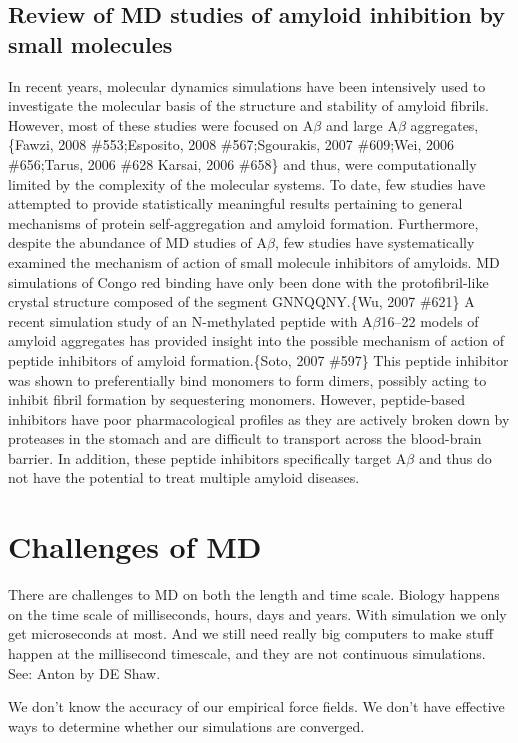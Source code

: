 \subsection{Review of MD studies of amyloid inhibition by small molecules}
\1 In recent years, molecular dynamics simulations have been intensively used to investigate the molecular basis of the structure and stability of amyloid fibrils. However, most of these studies were focused on A$\beta$ and large A$\beta$ aggregates,\{Fawzi, 2008 \#553;Esposito, 2008 \#567;Sgourakis, 2007 \#609;Wei, 2006 \#656;Tarus, 2006 \#628 Karsai, 2006 \#658\} and thus, were computationally limited by the complexity of the molecular systems. To date, few studies have attempted to provide statistically meaningful results pertaining to general mechanisms of protein self-aggregation and amyloid formation. Furthermore, despite the abundance of MD studies of A$\beta$, few studies have systematically examined the mechanism of action of small molecule inhibitors of amyloids. MD simulations of Congo red binding have only been done with the protofibril-like crystal structure composed of the segment GNNQQNY.\{Wu, 2007 \#621\} A recent simulation study of an N-methylated peptide with A$\beta$16--22 models of amyloid aggregates has provided insight into the possible mechanism of action of peptide inhibitors of amyloid formation.\{Soto, 2007 \#597\} This peptide inhibitor was shown to preferentially bind monomers to form dimers, possibly acting to inhibit fibril formation by sequestering monomers. However, peptide-based inhibitors have poor pharmacological profiles as they are actively broken down by proteases in the stomach and are difficult to transport across the blood-brain barrier. In addition, these peptide inhibitors specifically target A$\beta$ and thus do not have the potential to treat multiple amyloid diseases.

\section{Challenges of MD}  
\1 There are challenges to MD on both the length and time scale. Biology happens on the time scale of milliseconds, hours, days and years. With simulation we only get microseconds at most.  And we still need really big computers to make stuff happen at the millisecond timescale, and they are not continuous simulations. See: Anton by DE Shaw. 

\1 We don't know the accuracy of our empirical force fields. We don't have effective ways to determine whether our simulations are converged.

